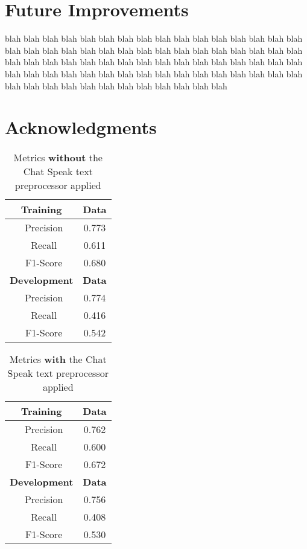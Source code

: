 \documentclass[11pt,letterpaper]{article}
\begin{document}
\section{Future Improvements}
blah blah blah blah blah blah blah blah blah blah blah blah blah blah blah blah blah blah blah 
blah blah blah blah blah blah blah blah blah blah blah blah blah blah blah blah blah blah blah 
blah blah blah blah blah blah blah blah blah blah blah blah blah blah blah blah blah blah blah 
blah blah blah blah blah blah blah blah blah blah blah blah blah blah blah blah blah blah blah 
\section*{Acknowledgments}



\begin{table}[htp]
\begin{center}
\begin{tabularx}{111pt}{|c|c|}
\hline
\bf Training & \bf Data \\ 
\hline
\ Precision & 0.773 \\
\ Recall & 0.611 \\
\ F1-Score & 0.680 \\
\hline
\bf Development & \bf Data \\ 
\hline
\ Precision & 0.774 \\
\ Recall & 0.416 \\
\ F1-Score & 0.542 \\
\hline
\end{tabularx}
\end{center}
\caption{\label{chatspeak-without-table} Metrics {\bf without} the Chat Speak text preprocessor applied }
\end{table}

\begin{table}[htp]
\begin{center}
\begin{tabularx}{111pt}{|c|c|}
\hline
\bf Training & \bf Data \\ 
\hline
\ Precision & 0.762 \\
\ Recall & 0.600 \\
\ F1-Score & 0.672 \\
\hline
\bf Development & \bf Data \\ 
\hline
\ Precision & 0.756 \\
\ Recall & 0.408 \\
\ F1-Score & 0.530 \\
\hline
\end{tabularx}
\end{center}
\caption{\label{chatspeak-with-table} Metrics {\bf with} the Chat Speak text preprocessor applied }
\end{table}
\end{document}
